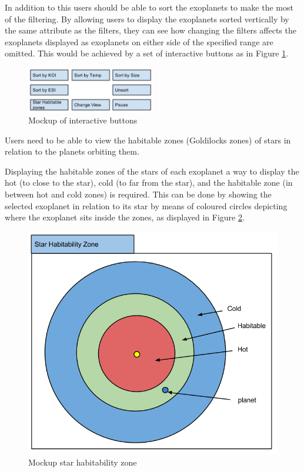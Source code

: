 \begin{enumerate}
In addition to this users should be able to sort the exoplanets to make
the most of the filtering. By allowing users to display the exoplanets sorted
vertically by the same attribute as the filters, they can see how
changing the filters affects the exoplanets displayed as exoplanets on either side of the specified range are omitted. This would be achieved by a set of interactive buttons as in Figure \ref{fig:mockButtons}.

\begin{figure}[H]
  \centering
      \includegraphics[width=0.5\textwidth]{images/mockButtons.png}
  \caption{Mockup of interactive buttons}  
  \label{fig:mockButtons}
\end{figure}

\clearpage
{\bf
 \item[R5.] Users need to be able to view the habitable zones (Goldilocks zones) of stars in
relation to the planets orbiting them.
}

Displaying the habitable zones of the stars of each exoplanet a way to display
the hot (to close to the star), cold (to far from the star), and the habitable
zone (in between hot and cold zones) is required. This can be done by showing
the selected exoplanet in relation to its star by means of coloured circles
depicting where the exoplanet sits inside the zones, as displayed in Figure
\ref{fig:hab}. 

\begin{figure}[H]
  \centering
      \includegraphics[width=.5\textwidth]{images/mockStarHabitability.png}
  \caption{Mockup star habitability zone}  
  \label{fig:hab}
\end{figure}




\end{enumerate}
\clearpage
